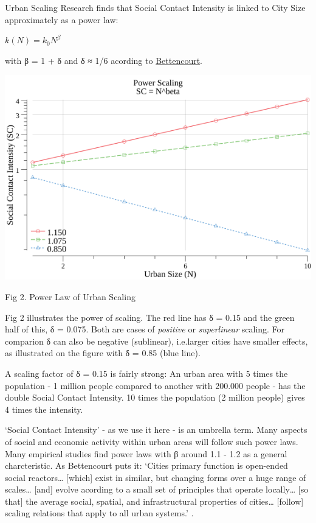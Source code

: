 \documentclass[
]{book}
\begin{document}
Urban Scaling Research finds that Social Contact Intensity is linked to City Size approximately
as a power law:

\(k(N) = k_{0} N^β\)

with β = 1 + δ and δ ≈ 1/6 acording to \href{https://science.sciencemag.org/content/340/6139/1438}{Bettencourt}.

\includegraphics{fig/scale_log.png}

Fig 2. Power Law of Urban Scaling

Fig 2 illustrates the power of scaling. The red line has δ = 0.15 and the green half of this,
δ = 0.075. Both are cases of \emph{positive} or \emph{superlinear} scaling. For comparion δ can also be
negative (sublinear), i.e.larger cities have smaller effects,
as illustrated on the figure with δ = 0.85 (blue line).

A scaling factor of δ = 0.15 is fairly strong: An urban area with 5 times the population -
1 million people compared to another with 200.000 people - has the double Social Contact Intensity.
10 times the population (2 million people) gives 4 times the intensity.

`Social Contact Intensity' - as we use it here - is an umbrella term.
Many aspects of social and economic activity within urban areas will follow such power laws.
Many empirical studies find power laws with β around 1.1 - 1.2 as a general charcteristic.
As Bettencourt puts it: `Cities primary function is open-ended social reactors\ldots{}
{[}which{]} exist in similar, but changing forms over a huge range of scales\ldots{}
{[}and{]} evolve acording to a small set of principles that operate locally\ldots{}
{[}so that{]} the average social, spatial, and infrastructural properties of cities\ldots{}
{[}follow{]} scaling relations that apply to all urban systems.' .
\end{document}
